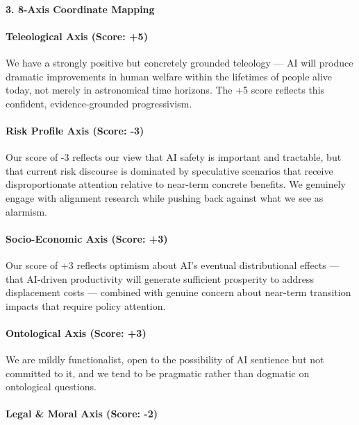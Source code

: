 \paragraph{3. 8-Axis Coordinate
Mapping}\label{axis-coordinate-mapping-14}

\paragraph{Teleological Axis (Score:
+5)}\label{teleological-axis-score-5}

We have a strongly positive but concretely grounded teleology --- AI
will produce dramatic improvements in human welfare within the lifetimes
of people alive today, not merely in astronomical time horizons. The +5
score reflects this confident, evidence-grounded progressivism.

\paragraph{Risk Profile Axis (Score:
-3)}\label{risk-profile-axis-score--3}

Our score of -3 reflects our view that AI safety is important and
tractable, but that current risk discourse is dominated by speculative
scenarios that receive disproportionate attention relative to near-term
concrete benefits. We genuinely engage with alignment research while
pushing back against what we see as alarmism.

\paragraph{Socio-Economic Axis (Score:
+3)}\label{socio-economic-axis-score-3-2}

Our score of +3 reflects optimism about AI's eventual distributional
effects --- that AI-driven productivity will generate sufficient
prosperity to address displacement costs --- combined with genuine
concern about near-term transition impacts that require policy
attention.

\paragraph{Ontological Axis (Score: +3)}\label{ontological-axis-score-3}

We are mildly functionalist, open to the possibility of AI sentience but
not committed to it, and we tend to be pragmatic rather than dogmatic on
ontological questions.

\paragraph{Legal \& Moral Axis (Score:
-2)}\label{legal-moral-axis-score--2}

